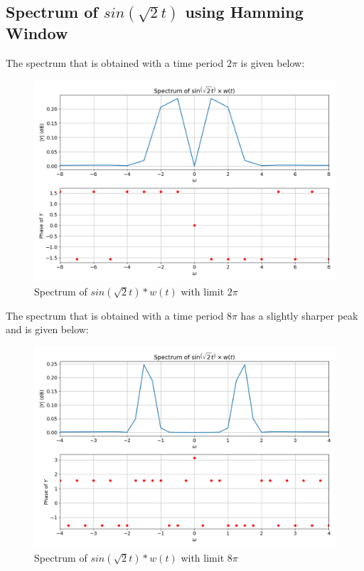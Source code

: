 \documentclass{article}
\begin{document}
\clearpage

\subsection{Spectrum of $sin(\sqrt{2}t)$ using Hamming Window} 

The spectrum that is obtained with a time period $2\pi$ is given below:

\begin{figure}[!tbh]
\centering
\includegraphics[scale=0.4]{plots/sin_sqrt2_window1.png}
\caption{Spectrum of $sin(\sqrt{2}t)*w(t)$ with limit $2\pi$}
\label{fig:6}
\end{figure}

The spectrum that is obtained with a time period $8\pi$ has a slightly sharper peak and is given below:


\begin{figure}[!tbh]
\centering
\includegraphics[scale=0.4]{plots/sin_sqrt2_window2.png}
\caption{Spectrum of $sin(\sqrt{2}t)*w(t)$ with limit $8\pi$}
\label{fig:7}
\end{figure}
\end{document}
